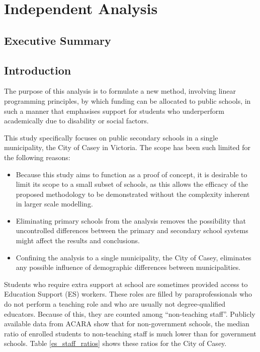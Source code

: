 \documentclass[11pt, a4paper]{article}
\begin{document}
    \newpage

    \section{Independent Analysis}

    \subsection{Executive Summary}



    \subsection{Introduction} \label{intro}

    The purpose of this analysis is to formulate a new method, involving linear programming principles, by which funding can be allocated to public schools, in such a manner that emphasises support for students who underperform academically due to disability or social factors. 
    
    This study specifically focuses on public secondary schools in a single municipality, the City of Casey in Victoria. The scope has been such limited for the following reasons:

    \begin{itemize}
        \item Because this study aims to function as a proof of concept, it is desirable to limit its scope to a small subset of schools, as this allows the efficacy of the proposed methodology to be demonstrated without the complexity inherent in larger scale modelling.
        \item Eliminating primary schools from the analysis removes the possibility that uncontrolled differences between the primary and secondary school systems might affect the results and conclusions.
        \item Confining the analysis to a single municipality, the City of Casey, eliminates any possible influence of demographic differences between municipalities.  
    \end{itemize}

    Students who require extra support at school are sometimes provided access to Education Support (ES) workers. These roles are filled by paraprofessionals who do not perform a teaching role and who are usually not degree-qualified educators. Because of this, they are counted among ``non-teaching staff''. Publicly available data from ACARA \parencite{acara_profiles} show that for non-government schools, the median ratio of enrolled students to non-teaching staff is much lower than for government schools. Table \ref{es_staff_ratios} shows these ratios for the City of Casey.
\end{document}
